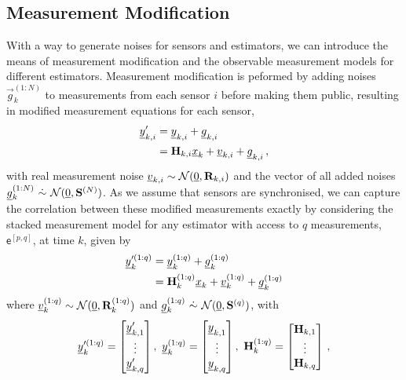 \documentclass[letterpaper, 10 pt, conference]{ieeeconf}
\begin{document}
\subsection{Measurement Modification}
With a way to generate noises for sensors and estimators, we can introduce the means of measurement modification and the observable measurement models for different estimators. Measurement modification is peformed by adding noises $\vec{g}_k^{(1:N)}$ to measurements from each sensor $i$ before making them public, resulting in modified measurement equations for each sensor,
\begin{equation}\label{eqn:modified_measurement}
\begin{split}
  {\underline{y}}_{k,i}^\prime &= {\underline{y}}_{k,i} + {\underline{g}}_{k,i}\\
  &= {{\mathbf{H}}}_{k,i}{\underline{x}}_k + {\underline{v}}_{k,i} + {\underline{g}}_{k,i}\,,
\end{split}
\end{equation}
with real measurement noise ${\underline{v}}_{k,i}\sim\mathcal{N}({\underline{0}},{{\mathbf{R}}}_{k,i})$ and the vector of all added noises ${\underline{g}}_k^{(1:N)}\ \dot{\sim}\ \mathcal{N}({\underline{0}}, {{\mathbf{S}}}^{(N)})$. As we assume that sensors are synchronised, we can capture the correlation between these modified measurements exactly by considering the stacked measurement model for any estimator with access to $q$ measurements, $\mathsf{e}^{[p,q]}$, at time $k$, given by
\begin{equation}\label{eqn:measurement_equation}
  \begin{split}
    {\underline{y}}_k^{\prime(1:q)} &= {\underline{y}}_k^{(1:q)} + {\underline{g}}_k^{(1:q)}\\
    &= {{\mathbf{H}}}_k^{(1:q)}{\underline{x}}_k + {\underline{v}}_k^{(1:q)} + {\underline{g}}_k^{(1:q)}
  \end{split}
\end{equation}
where ${\underline{v}}_k^{(1:q)}\sim\mathcal{N}({\underline{0}},{{\mathbf{R}}}_k^{(1:q)})$ and $\vec{g}_k^{(1:q)}\ \dot{\sim}\ \mathcal{N}(\vec{0},\mat{S}^{(q)})$, with
\begin{equation*}
  \vec{y}_k^{\prime(1:q)}=
  \begin{bmatrix}
    \vec{y}_{k,1}^\prime\\
    \vdots\\
    \vec{y}_{k,q}^\prime
  \end{bmatrix},\ 
  \vec{y}_k^{(1:q)}=
  \begin{bmatrix}
    \vec{y}_{k,1}\\
    \vdots\\
    \vec{y}_{k,q}
  \end{bmatrix},\ 
  \mat{H}_k^{(1:q)}=
  \begin{bmatrix}
    \mat{H}_{k,1}\\
    \vdots\\
    \mat{H}_{k,q}\\
  \end{bmatrix}\,,
\end{equation*}
\end{document}
